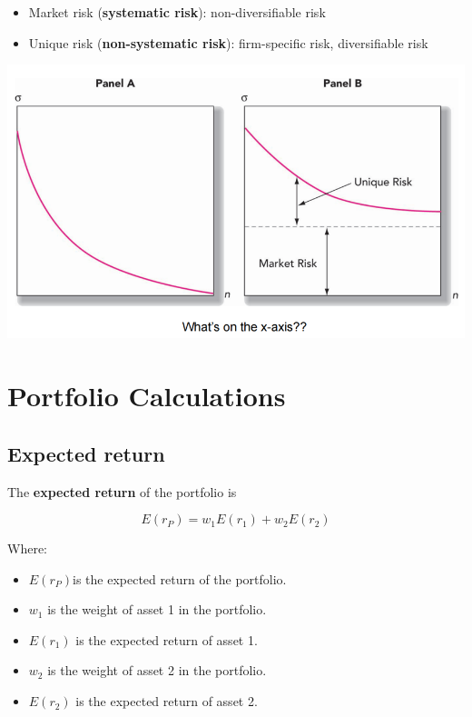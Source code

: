 \documentclass[
]{book}
\providecommand{\tightlist}{%
  \setlength{\itemsep}{0pt}\setlength{\parskip}{0pt}}
\begin{document}
\begin{itemize}
\tightlist
\item
  Market risk (\textbf{systematic risk}): non-diversifiable risk
\item
  Unique risk (\textbf{non-systematic risk}): firm-specific risk,
  diversifiable risk
\end{itemize}

\includegraphics{Resources/sysrisk.png}

\hypertarget{portfolio-calculations}{%
\section{Portfolio Calculations}\label{portfolio-calculations}}

\hypertarget{expected-return-1}{%
\subsection{Expected return}\label{expected-return-1}}

The \textbf{expected return} of the portfolio is

\[ E(r_P) = w_1 E(r_1) + w_2 E(r_2) \]

Where:

\begin{itemize}
\tightlist
\item
  \(E(r_P)\)is the expected return of the portfolio.
\item
  \(w_1\) is the weight of asset 1 in the portfolio.
\item
  \(E(r_1)\) is the expected return of asset 1.
\item
  \(w_2\) is the weight of asset 2 in the portfolio.
\item
  \(E(r_2)\) is the expected return of asset 2.
\end{itemize}
\end{document}

